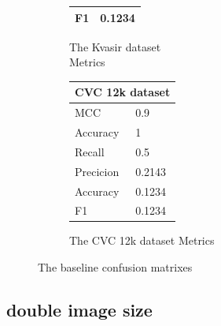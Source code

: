 \begin{figure}[h]
\begin{subfigure}[b]{0.49\textwidth}
\begin{tabular}{ll}
        F1                                     & 0.1234\\
        \bottomrule
\end{tabular}
\caption{The Kvasir dataset\\ Metrics}
\label{tab:kvasir_metrics_base}
\end{subfigure}%
\begin{subfigure}[b]{0.25\textwidth}
        \begin{tabular}{ll}
        \toprule
        \multicolumn{2}{c}{CVC 12k dataset}        \\
        \midrule
        MCC & 0.9    \\
        Accuracy                         & 1      \\
        Recall                              & 0.5    \\
        Precicion                        & 0.2143 \\
        Accuracy                        & 0.1234 \\
        F1                                     & 0.1234\\
        \bottomrule
        \end{tabular}
\caption{The CVC 12k dataset Metrics}
\label{tab:cvc12k_metrics_base}
\end{subfigure}
\caption{The baseline confusion matrixes}
\label{fig:BaselineCM}
\end{figure}
\FloatBarrier



\subsection{double image size}


